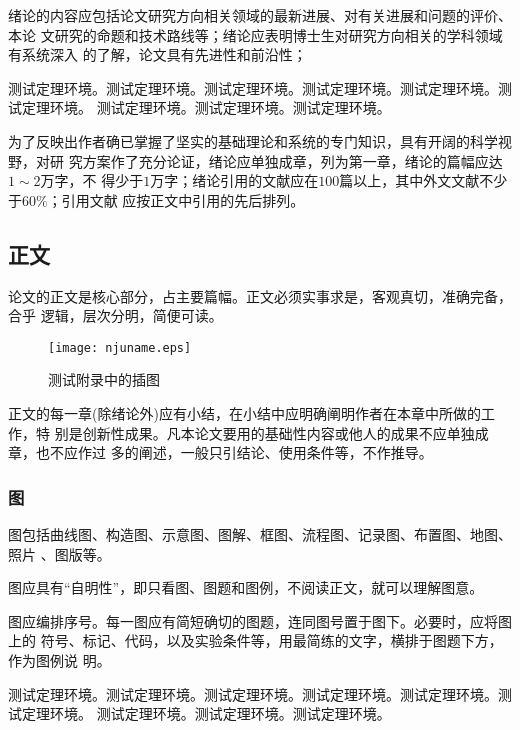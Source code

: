 \documentclass[master]{njuthesis}
\begin{document}
绪论的内容应包括论文研究方向相关领域的最新进展、对有关进展和问题的评价、本论
文研究的命题和技术路线等；绪论应表明博士生对研究方向相关的学科领域有系统深入
的了解，论文具有先进性和前沿性；

\begin{problem}
测试定理环境。测试定理环境。测试定理环境。测试定理环境。测试定理环境。测试定理环境。
测试定理环境。测试定理环境。测试定理环境。
\end{problem}

为了反映出作者确已掌握了坚实的基础理论和系统的专门知识，具有开阔的科学视野，对研
究方案作了充分论证，绪论应单独成章，列为第一章，绪论的篇幅应达$1\sim 2$万字，不
得少于$1$万字；绪论引用的文献应在$100$篇以上，其中外文文献不少于$60\%$；引用文献
应按正文中引用的先后排列。

\subsection{正文}

论文的正文是核心部分，占主要篇幅。正文必须实事求是，客观真切，准确完备，合乎
逻辑，层次分明，简便可读。

\begin{figure}[htbp]
  \centering
  \texttt{[image: njuname.eps]}\\
  \caption{测试附录中的插图}\label{fig:appendix2}
\end{figure}

正文的每一章(除绪论外)应有小结，在小结中应明确阐明作者在本章中所做的工作，特
别是创新性成果。凡本论文要用的基础性内容或他人的成果不应单独成章，也不应作过
多的阐述，一般只引结论、使用条件等，不作推导。

\subsubsection{图}

图包括曲线图、构造图、示意图、图解、框图、流程图、记录图、布置图、地图、照片
、图版等。

图应具有“自明性”，即只看图、图题和图例，不阅读正文，就可以理解图意。

图应编排序号。每一图应有简短确切的图题，连同图号置于图下。必要时，应将图上的
符号、标记、代码，以及实验条件等，用最简练的文字，横排于图题下方，作为图例说
明。

\begin{example}
测试定理环境。测试定理环境。测试定理环境。测试定理环境。测试定理环境。测试定理环境。
测试定理环境。测试定理环境。测试定理环境。
\end{example}
\end{document}

